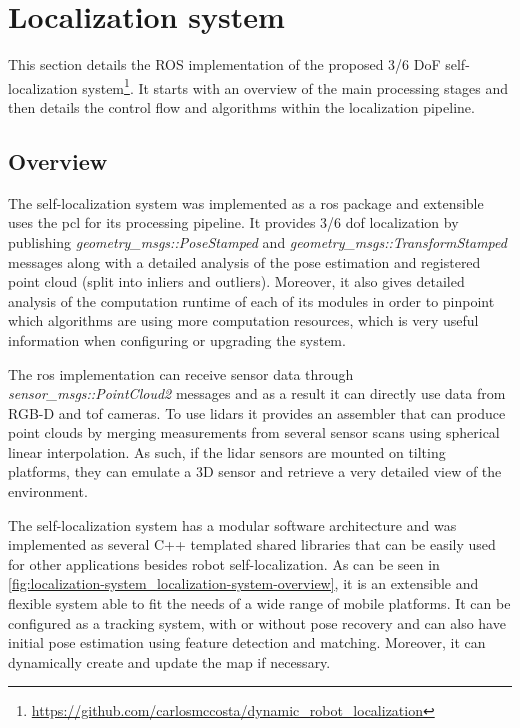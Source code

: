 \section{Localization system}\label{sec:localization-system}

This section details the ROS implementation of the proposed 3/6 DoF self-localization system\footnote{\url{https://github.com/carlosmccosta/dynamic_robot_localization}}. It starts with an overview of the main processing stages and then details the control flow and algorithms within the localization pipeline.

\subsection{Overview}

The self-localization system was implemented as a \gls{ros} package and extensible uses the \gls{pcl} \cite{Rusu2011} for its processing pipeline. It provides 3/6 \gls{dof} localization by publishing \emph{geometry\_msgs::PoseStamped} and \emph{geometry\_msgs::TransformStamped} messages along with a detailed analysis of the pose estimation and registered point cloud (split into inliers and outliers). Moreover, it also gives detailed analysis of the computation runtime of each of its modules in order to pinpoint which algorithms are using more computation resources, which is very useful information when configuring or upgrading the system.

The \gls{ros} implementation can receive sensor data through \emph{sensor\_msgs::PointCloud2} messages and as a result it can directly use data from RGB-D and \gls{tof} cameras. To use \glspl{lidar} it provides an assembler that can produce point clouds by merging measurements from several sensor scans using spherical linear interpolation. As such, if the \gls{lidar} sensors are mounted on tilting platforms, they can emulate a 3D sensor and retrieve a very detailed view of the environment.

The self-localization system has a modular software architecture and was implemented as several C++ templated shared libraries that can be easily used for other applications besides robot self-localization. As can be seen in \cref{fig:localization-system_localization-system-overview}, it is an extensible and flexible system able to fit the needs of a wide range of mobile platforms. It can be configured as a tracking system, with or without pose recovery and can also have initial pose estimation using feature detection and matching. Moreover, it can dynamically create and update the map if necessary.

